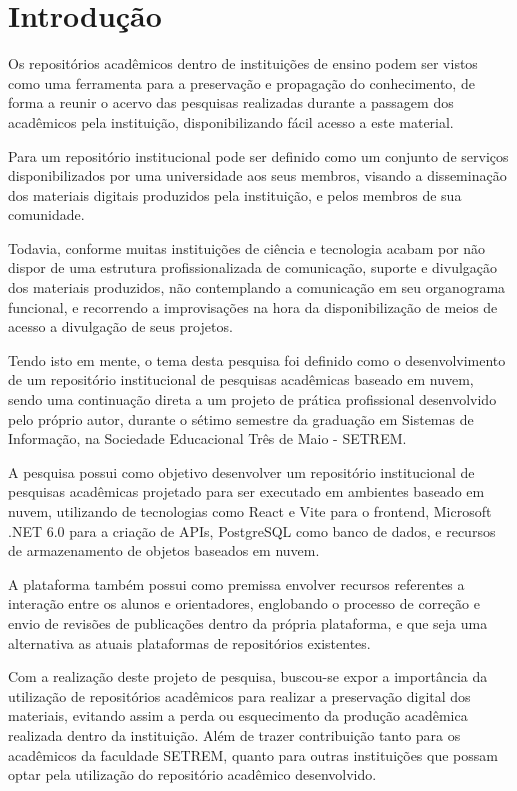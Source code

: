 \chapter*{Introdução} \label{chap:intro}

Os repositórios acadêmicos dentro de instituições de ensino
podem ser vistos como uma ferramenta para a preservação
e propagação do conhecimento, de forma a reunir o acervo das
pesquisas realizadas durante a passagem dos acadêmicos
pela instituição, disponibilizando fácil acesso a este
material.

Para \cite{LYNCH:2003} um repositório institucional pode
ser definido como um conjunto de serviços disponibilizados
por uma universidade aos seus membros, visando a disseminação
dos materiais digitais produzidos pela instituição, e pelos
membros de sua comunidade.

Todavia, conforme \cite{PORTO:difusao_cientifica_recortes}
muitas instituições de ciência e tecnologia acabam por não
dispor de uma estrutura profissionalizada de comunicação,
suporte e divulgação dos materiais produzidos, não contemplando
a comunicação em seu organograma funcional, e recorrendo a
improvisações na hora da disponibilização de meios de acesso
a divulgação de seus projetos.

Tendo isto em mente, o tema desta pesquisa foi definido como
o desenvolvimento de um repositório institucional de pesquisas
acadêmicas baseado em nuvem, sendo uma continuação direta a um
projeto de prática profissional desenvolvido pelo próprio autor,
durante o sétimo semestre da graduação em Sistemas de Informação, na
Sociedade Educacional Três de Maio - SETREM.

A pesquisa possui como objetivo desenvolver um repositório institucional
de pesquisas acadêmicas projetado para ser executado em ambientes
baseado em nuvem, utilizando de tecnologias como React e Vite para o
frontend, Microsoft .NET 6.0 para a criação de APIs, PostgreSQL como banco
de dados, e recursos de armazenamento de objetos baseados em nuvem.

A plataforma também possui como premissa envolver recursos referentes
a interação entre os alunos e orientadores, englobando o processo de correção
e envio de revisões de publicações dentro da própria plataforma, e que seja
uma alternativa as atuais plataformas de repositórios existentes.

Com a realização deste projeto de pesquisa, buscou-se expor a
importância da utilização de repositórios acadêmicos para realizar
a preservação digital dos materiais, evitando assim a perda
ou esquecimento da produção acadêmica realizada dentro da instituição.
Além de trazer contribuição tanto para os acadêmicos da faculdade SETREM, quanto para outras
instituições que possam optar pela utilização do repositório
acadêmico desenvolvido.

